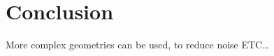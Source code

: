 \section{Conclusion}
More complex geometries can be used, to reduce noise ETC\ldots \cite{burke_introduction_2013}